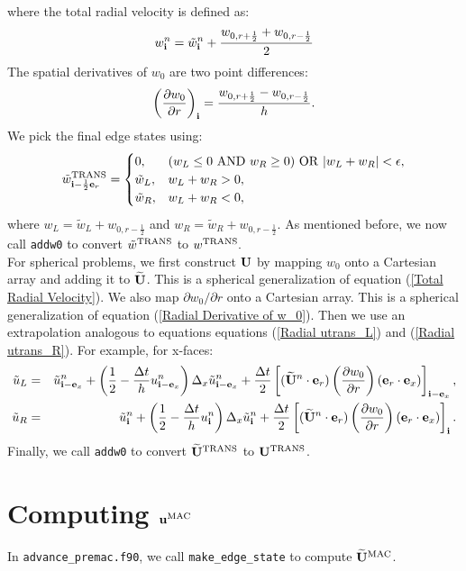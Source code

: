\documentclass[11pt]{article}
\def\half  {\frac{1}{2}}
\def\dt    {\Delta t}
\def\mac   {\rm MAC}
\def\trans {\rm TRANS}
\def\eb    {{\bf e}}
\def\ib    {{\bf i}}
\def\ub    {{\bf u}}
\def\Ub    {{\bf U}}
\def\Ubt   {\widetilde{\bf U}}
\def\ut    {\tilde{u}}
\def\wt    {\tilde{w}}
\begin{document}
where the total radial velocity is defined as:
\begin{equation}
w_{\ib}^n = \wt_{\ib}^n + \frac{w_{0,r+\half}+w_{0,r-\half}}{2}\label{Total Radial Velocity}
\end{equation}
The spatial derivatives of $w_0$ are two point differences:
\begin{equation}
\left(\frac{\partial w_0}{\partial r}\right)_{\ib} = \frac{w_{0,r+\half}-w_{0,r-\half}}{h}.\label{Radial Derivative of w_0}
\end{equation}
We pick the final edge states using:
\begin{equation}
\wt^{\trans}_{\ib-\half\eb_r} =
\begin{cases}
0, & (w_L \le 0 ~ {\rm AND} ~ w_R \ge 0) ~ {\rm OR} ~ |w_L + w_R| < \epsilon, \\
\wt_L, & w_L + w_R > 0, \\
\wt_R, & w_L + w_R < 0, \\
\end{cases}
\end{equation}
where $w_L = \wt_L + w_{0,r-\half}$ and $w_R = \wt_R + w_{0,r-\half}$.  As mentioned before, we now call {\tt addw0} to convert $\wt^{\trans}$ to $w^{\trans}.$\\

For spherical problems, we first construct $\Ub$ by mapping $w_0$ onto a Cartesian array and adding it to $\Ubt$.  This is a spherical generalization of equation (\ref{Total Radial Velocity}).  We also map $\partial w_0/\partial r$ onto a Cartesian array.  This is a spherical generalization of equation (\ref{Radial Derivative of w_0}).  Then we use an extrapolation analogous to equations equations (\ref{Radial utrans_L}) and (\ref{Radial utrans_R}).  For example, for x-faces:
\begin{eqnarray}
\ut_L &=& \ut_{\ib-\eb_x}^n + \left(\half - \frac{\dt}{h}u_{\ib-\eb_x}^n\right)\Delta_x\ut_{\ib-\eb_x}^n + \frac{\dt}{2}\left[(\Ubt^n\cdot\eb_r)\left(\frac{\partial w_0}{\partial r}\right)(\eb_r\cdot\eb_x)\right]_{\ib-\eb_x}, \\
\ut_R &=& \ut_{\ib}^n + \left(\half - \frac{\dt}{h}u_{\ib}^n\right)\Delta_x\ut_{\ib}^n + \frac{\dt}{2}\left[(\Ubt^n\cdot\eb_r)\left(\frac{\partial w_0}{\partial r}\right)(\eb_r\cdot\eb_x)\right]_{\ib}.
\end{eqnarray}
Finally, we call {\tt addw0} to convert $\Ubt^{\trans}$ to $\Ub^{\trans}$.
\section{Computing $\ub^{\mac}$}
In {\tt advance\_premac.f90}, we call {\tt make\_edge\_state} to compute $\Ubt^{\mac}$.
\end{document}

